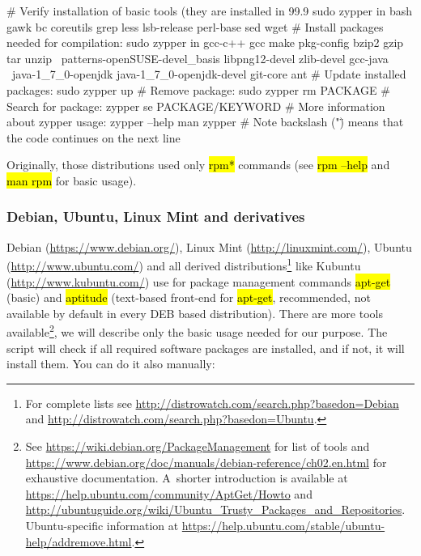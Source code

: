 \documentclass[a4paper, 11pt, twoside]{article}
\renewcommand{\texttt}[1]{\hl{\ttfamily #1}}
\begin{document}
\begin{bashcode}
  # Verify installation of basic tools (they are installed in 99.9%
  sudo zypper in bash gawk bc coreutils grep less lsb-release perl-base sed wget
  # Install packages needed for compilation:
  sudo zypper in gcc-c++ gcc make pkg-config bzip2 gzip tar unzip \
    patterns-openSUSE-devel_basis libpng12-devel zlib-devel gcc-java \
    java-1_7_0-openjdk java-1_7_0-openjdk-devel git-core ant
  # Update installed packages:
  sudo zypper up
  # Remove package:
  sudo zypper rm PACKAGE
  # Search for package:
  zypper se PACKAGE/KEYWORD
  # More information about zypper usage:
  zypper --help
  man zypper
  # Note backslash ("\") means that the code continues on the next line
\end{bashcode}

Originally, those distributions used only \texttt{rpm*} commands (see \texttt{rpm --help} and \texttt{man rpm} for basic usage).

\subsubsection{Debian, Ubuntu, Linux Mint and derivatives}

Debian (\url{https://www.debian.org/}), Linux Mint (\url{http://linuxmint.com/}), Ubuntu (\url{http://www.ubuntu.com/}) and all derived distributions\footnote{For complete lists see \url{http://distrowatch.com/search.php?basedon=Debian} and \url{http://distrowatch.com/search.php?basedon=Ubuntu}.} like Kubuntu (\url{http://www.kubuntu.com/}) use for package management commands \texttt{apt-get} (basic) and \texttt{aptitude} (text-based front-end for \texttt{apt-get}, recommended, not available by default in every DEB based distribution). There are more tools available\footnote{See \url{https://wiki.debian.org/PackageManagement} for list of tools and \url{https://www.debian.org/doc/manuals/debian-reference/ch02.en.html} for exhaustive documentation. A~shorter introduction is available at \url{https://help.ubuntu.com/community/AptGet/Howto} and \url{http://ubuntuguide.org/wiki/Ubuntu_Trusty_Packages_and_Repositories}. Ubuntu-specific information at \url{https://help.ubuntu.com/stable/ubuntu-help/addremove.html}.}, we will describe only the basic usage needed for our purpose. The script will check if all required software packages are installed, and if not, it will install them. You can do it also manually:
\end{document}
